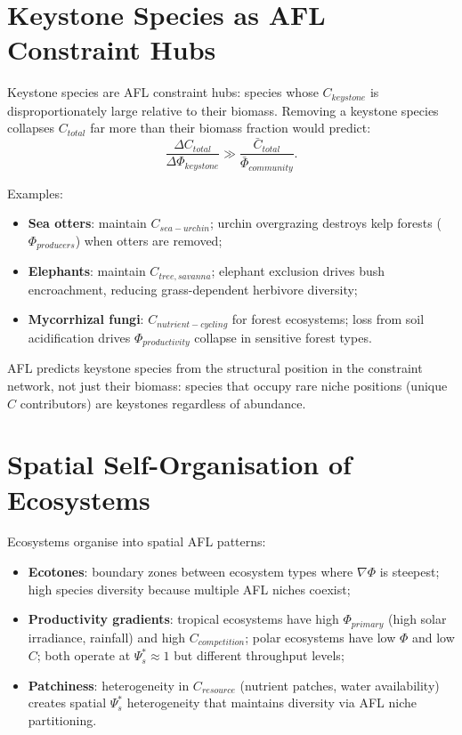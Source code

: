 \documentclass[11pt]{article}
\begin{document}
\section{Keystone Species as AFL Constraint Hubs}

Keystone species are AFL constraint hubs: species whose $C_{keystone}$ is disproportionately
large relative to their biomass. Removing a keystone species collapses $C_{total}$ far more
than their biomass fraction would predict:
\begin{equation}
\frac{\Delta C_{total}}{\Delta \Phi_{keystone}} \gg \frac{\bar{C}_{total}}{\bar{\Phi}_{community}}.
\end{equation}

Examples:
\begin{itemize}
    \item \textbf{Sea otters}: maintain $C_{sea-urchin}$; urchin overgrazing destroys kelp forests
          ($\Phi_{producers}$) when otters are removed;
    \item \textbf{Elephants}: maintain $C_{tree,savanna}$; elephant exclusion drives bush encroachment,
          reducing grass-dependent herbivore diversity;
    \item \textbf{Mycorrhizal fungi}: $C_{nutrient-cycling}$ for forest ecosystems; loss from
          soil acidification drives $\Phi_{productivity}$ collapse in sensitive forest types.
\end{itemize}

AFL predicts keystone species from the structural position in the constraint network, not just
their biomass: species that occupy rare niche positions (unique $C$ contributors) are keystones
regardless of abundance.

\section{Spatial Self-Organisation of Ecosystems}

Ecosystems organise into spatial AFL patterns:
\begin{itemize}
    \item \textbf{Ecotones}: boundary zones between ecosystem types where $\nabla\Phi$ is steepest;
          high species diversity because multiple AFL niches coexist;
    \item \textbf{Productivity gradients}: tropical ecosystems have high $\Phi_{primary}$ (high
          solar irradiance, rainfall) and high $C_{competition}$; polar ecosystems have low $\Phi$
          and low $C$; both operate at $\Psi_s^* \approx 1$ but different throughput levels;
    \item \textbf{Patchiness}: heterogeneity in $C_{resource}$ (nutrient patches, water availability)
          creates spatial $\Psi_s^*$ heterogeneity that maintains diversity via AFL niche partitioning.
\end{itemize}
\end{document}
